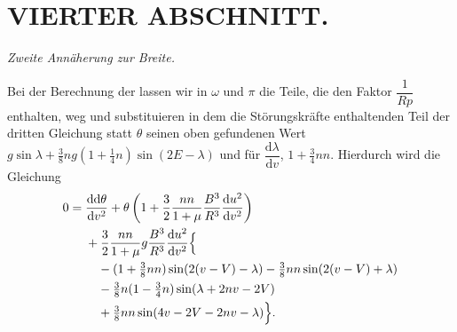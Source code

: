 \clearpage
\begingroup
{}
\renewcommand{\headrulewidth}{0pt}
\section*{VIERTER ABSCHNITT.}
\begin{center}
\itshape Zweite Annäherung zur Breite.
\end{center}

\par\noindent\hspace*{\parindent}Bei der Berechnung der  lassen wir in \(\omega\) und \(\pi\) die Teile, die
den Faktor \(\dfrac{1}{Rp}\) enthalten, weg und substituieren in dem die Störungskräfte
enthaltenden Teil der dritten Gleichung statt \(\theta\) seinen oben gefundenen
Wert \(g\sin\lambda+\tfrac38ng(1+\tfrac14n)\sin(2E-\lambda)\) und für
\(\dfrac{\mathrm{d}\lambda}{\mathrm{d}v}\), \(1+\tfrac34nn\). Hierdurch wird die Gleichung
\[
\begin{aligned}
0={}&\frac{\mathrm{dd}\theta}{\mathrm{d}v^2}
+\theta\left(1+\frac32\frac{nn}{1+\mu}\frac{B^3}{R^3}
\frac{\mathrm{d}u^2}{\mathrm{d}v^2}\right)\\
&+\frac32\frac{nn}{1+\mu}g\frac{B^3}{R^3}\frac{\mathrm{d}u^2}{\mathrm{d}v^2}\Bigl\{\\
&\quad -(1+\tfrac38nn)\sin(2(v-V)-\lambda)
-\tfrac38nn\sin(2(v-V)+\lambda)\\
&\quad -\tfrac38n(1-\tfrac34n)\sin(\lambda+2nv-2V)\\
&\quad +\tfrac38nn\sin(4v-2V-2nv-\lambda)\Bigr\}.
\end{aligned}
\]


